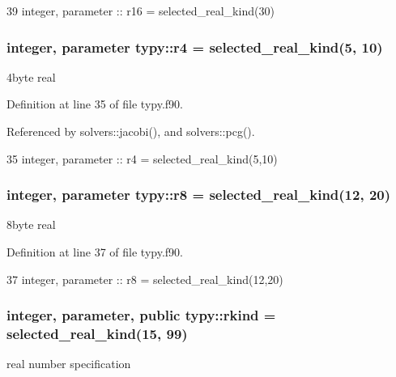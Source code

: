 \begin{DoxyCode}
39     \textcolor{keywordtype}{integer}, \textcolor{keywordtype}{parameter} :: r16 = selected\_real\_kind(30)
\end{DoxyCode}
\subsubsection[{r4}]{\setlength{\rightskip}{0pt plus 5cm}integer, parameter typy\+::r4 = selected\+\_\+real\+\_\+kind(5, 10)}\label{namespacetypy_ac852c2bd4923127662b9ae950f7bd1c0}


4byte real 



Definition at line 35 of file typy.\+f90.



Referenced by solvers\+::jacobi(), and solvers\+::pcg().


\begin{DoxyCode}
35     \textcolor{keywordtype}{integer}, \textcolor{keywordtype}{parameter} :: r4  = selected\_real\_kind(5,10)
\end{DoxyCode}
\subsubsection[{r8}]{\setlength{\rightskip}{0pt plus 5cm}integer, parameter typy\+::r8 = selected\+\_\+real\+\_\+kind(12, 20)}\label{namespacetypy_aee26dcc94380ff1a097ec84546a87020}


8byte real 



Definition at line 37 of file typy.\+f90.


\begin{DoxyCode}
37     \textcolor{keywordtype}{integer}, \textcolor{keywordtype}{parameter} :: r8  = selected\_real\_kind(12,20)
\end{DoxyCode}
\subsubsection[{rkind}]{\setlength{\rightskip}{0pt plus 5cm}integer, parameter, public typy\+::rkind = selected\+\_\+real\+\_\+kind(15, 99)}\label{namespacetypy_a2169287dfed38b596625c595cf3b5677}


real number specification 



